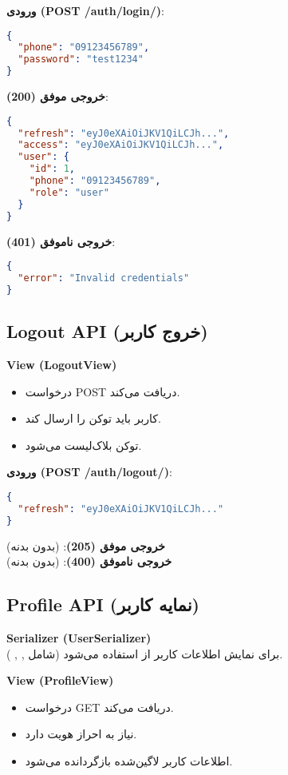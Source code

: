 \documentclass{report}
\begin{document}
\textbf{ورودی (POST /auth/login/)}:
\begin{lstlisting}[language=json]
{
  "phone": "09123456789",
  "password": "test1234"
}
\end{lstlisting}

\textbf{خروجی موفق (200)}:
\begin{lstlisting}[language=json]
{
  "refresh": "eyJ0eXAiOiJKV1QiLCJh...",
  "access": "eyJ0eXAiOiJKV1QiLCJh...",
  "user": {
    "id": 1,
    "phone": "09123456789",
    "role": "user"
  }
}
\end{lstlisting}

\textbf{خروجی ناموفق (401)}:
\begin{lstlisting}[language=json]
{
  "error": "Invalid credentials"
}
\end{lstlisting}


\subsection{Logout API (خروج کاربر)}
\textbf{View (LogoutView)} \\
\begin{itemize}
  \item درخواست POST دریافت می‌کند.
  \item کاربر باید توکن  را ارسال کند.
  \item توکن بلاک‌لیست می‌شود.
\end{itemize}

\textbf{ورودی (POST /auth/logout/)}:
\begin{lstlisting}[language=json]
{
  "refresh": "eyJ0eXAiOiJKV1QiLCJh..."
}
\end{lstlisting}

\textbf{خروجی موفق (205)}: (بدون بدنه) \\
\textbf{خروجی ناموفق (400)}: (بدون بدنه)


\subsection{Profile API (نمایه کاربر)}
\textbf{Serializer (UserSerializer)} \\
برای نمایش اطلاعات کاربر از  استفاده می‌شود (شامل , , ).

\textbf{View (ProfileView)} \\
\begin{itemize}
  \item درخواست GET دریافت می‌کند.
  \item نیاز به احراز هویت دارد.
  \item اطلاعات کاربر لاگین‌شده بازگردانده می‌شود.
\end{itemize}
\end{document}

